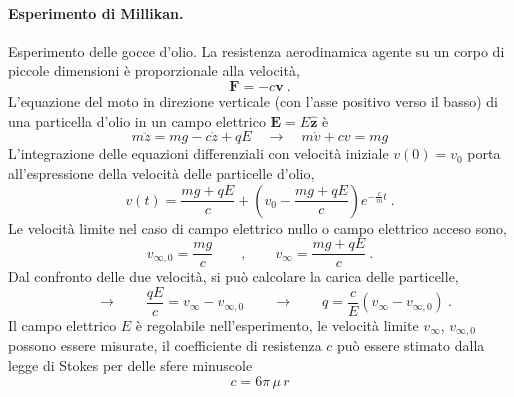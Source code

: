 \paragraph{Esperimento di Millikan.} Esperimento delle gocce d'olio. La resistenza aerodinamica agente su un corpo di piccole dimensioni è proporzionale alla velocità,
\begin{equation}
    \mathbf{F} = - c \mathbf{v} \ .
\end{equation}
L'equazione del moto in direzione verticale (con l'asse positivo verso il basso) di una particella d'olio in un campo elettrico $\mathbf{E} = E \mathbf{\hat{z}}$ è 
\begin{equation}
    m \ddot{z} = m g - c \dot{z} + q E \quad \rightarrow \quad
    m \dot{v} + c v = m g
\end{equation}
L'integrazione delle equazioni differenziali con velocità iniziale $v(0) = v_0$ porta all'espressione della velocità delle particelle d'olio,
\begin{equation}
    v(t) =  \frac{mg + qE}{c} + \left( v_0 - \dfrac{mg + qE}{c} \right)  e^{-\frac{c}{m} t}  \ .
\end{equation}
Le velocità limite nel caso di campo elettrico nullo o campo elettrico acceso sono,
\begin{equation}
    v_{\infty,0} = \dfrac{mg}{c} \qquad , \qquad
    v_{\infty} = \dfrac{mg + qE}{c} \ .
\end{equation}
Dal confronto delle due velocità, si può calcolare la carica delle particelle,
\begin{equation}
    \qquad \rightarrow \qquad
    \frac{q E}{c} = v_{\infty} - v_{\infty,0}
    \qquad \rightarrow \qquad
    q = \dfrac{c}{E} \left( v_{\infty} - v_{\infty,0} \right) \ .
\end{equation}
Il campo elettrico $E$ è regolabile nell'esperimento, le velocità limite $v_{\infty}$, $v_{\infty,0}$ possono essere misurate, il coefficiente di resistenza $c$ può essere stimato dalla legge di Stokes per delle sfere minuscole
\begin{equation}
    c = 6 \pi \, \mu \, r
\end{equation}

